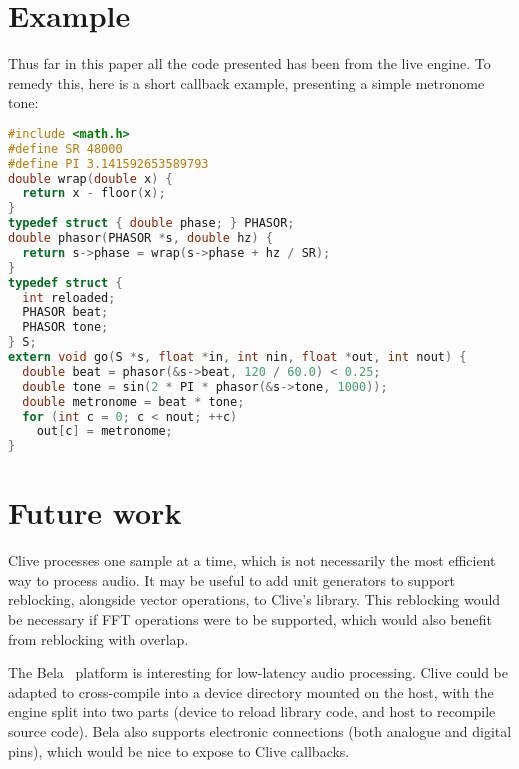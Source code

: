 \documentclass[11pt,a4paper]{article}
\begin{document}

\section{Example}\label{example}

Thus far in this paper all the code presented has been from the live
engine. To remedy this, here is a short callback example, presenting
a simple metronome tone:

\begin{lstlisting}[language=C, caption={Metronome example}, label=lexample]
#include <math.h>
#define SR 48000
#define PI 3.141592653589793
double wrap(double x) {
  return x - floor(x);
}
typedef struct { double phase; } PHASOR;
double phasor(PHASOR *s, double hz) {
  return s->phase = wrap(s->phase + hz / SR);
}
typedef struct {
  int reloaded;
  PHASOR beat;
  PHASOR tone;
} S;
extern void go(S *s, float *in, int nin, float *out, int nout) {
  double beat = phasor(&s->beat, 120 / 60.0) < 0.25;
  double tone = sin(2 * PI * phasor(&s->tone, 1000));
  double metronome = beat * tone;
  for (int c = 0; c < nout; ++c)
    out[c] = metronome;
}
\end{lstlisting}

\section{Future work}\label{future-work}

Clive processes one sample at a time, which is not necessarily the most
efficient way to process audio.  It may be useful to add unit generators to
support reblocking, alongside vector operations, to Clive's library.  This
reblocking would be necessary if FFT operations were to be supported,
which would also benefit from reblocking with overlap.

The Bela~\cite{BELA} platform is interesting for low-latency audio processing.
Clive could be adapted to cross-compile into a device directory mounted on
the host, with the engine split into two parts (device to reload library
code, and host to recompile source code).  Bela also supports electronic
connections (both analogue and digital pins), which would be nice to expose
to Clive callbacks.
\end{document}
